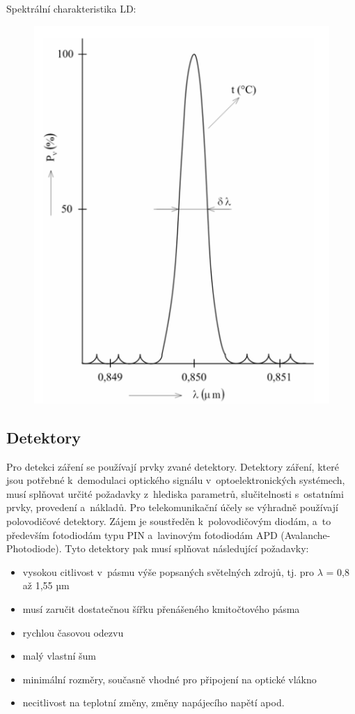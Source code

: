 Spektrální charakteristika LD:

\begin{figure}[!ht]
  \begin{center}
    \includegraphics[scale=0.6]{obrazky/spektrLD.png}
  \end{center}
\end{figure}

\subsection{Detektory}
Pro detekci záření se používají prvky zvané detektory. Detektory záření, které jsou potřebné k~demodulaci optického signálu v~optoelektronických systémech, musí splňovat určité požadavky z~hlediska parametrů, slučitelnosti s~ostatními prvky, provedení a~nákladů. Pro telekomunikační účely se výhradně používají polovodičové detektory. Zájem je soustředěn k~polovodičovým diodám, a~to především fotodiodám typu PIN a~lavinovým fotodiodám APD (Avalanche-Photodiode). Tyto detektory pak musí splňovat následující požadavky:
\begin{itemize}
  \item vysokou citlivost v~pásmu výše popsaných světelných zdrojů, tj. pro $\lambda$ = 0,8 až 1,55 µm
  \item musí zaručit dostatečnou šířku přenášeného kmitočtového pásma
  \item rychlou časovou odezvu
  \item malý vlastní šum
  \item minimální rozměry, současně vhodné pro připojení na optické vlákno
  \item necitlivost na teplotní změny, změny napájecího napětí apod.
\end{itemize}

